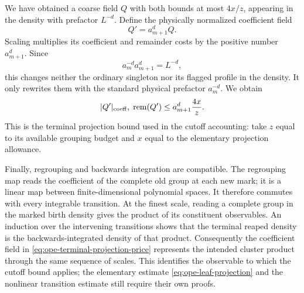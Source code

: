 We have obtained a coarse field $Q$ with both bounds at most
$4x/z$, appearing in the density with prefactor $L^{-d}$.
Define the physically normalized coefficient field
\[
                              Q'=a_{m+1}^dQ.
\]
Scaling multiplies its coefficient and remainder costs by the
positive number $a_{m+1}^d$. Since
\[
                     a_m^{-d}a_{m+1}^d=L^{-d},
\]
this changes neither the ordinary singleton nor its flagged
profile in the density. It only rewrites them with the standard
physical prefactor $a_m^{-d}$. We obtain
\begin{equation}\label{eq:ope-terminal-projection-price}
      |Q'|_{\rm coeff},\;\operatorname{rem}(Q')
                           \le a_{m+1}^d\frac{4x}{z}.
\end{equation}
This is the terminal projection bound used in the cutoff
accounting: take $z$ equal to its available grouping budget and
$x$ equal to the elementary projection allowance.

Finally, regrouping and backwards integration are compatible.
The regrouping map reads the coefficient of the complete old
group at each new mark; it is a linear map between finite-dimensional
polynomial spaces. It therefore commutes with every integrable
transition. At the finest scale, reading a complete group in
the marked birth density gives the product of its constituent
observables. An induction over the intervening transitions shows
that the terminal reaped density is the backwards-integrated
density of that product. Consequently the coefficient field in
\eqref{eq:ope-terminal-projection-price} represents the intended
cluster product through the same sequence of scales. This
identifies the observable to which the cutoff bound applies;
the elementary estimate \eqref{eq:ope-leaf-projection} and the
nonlinear transition estimate still require their own proofs.
